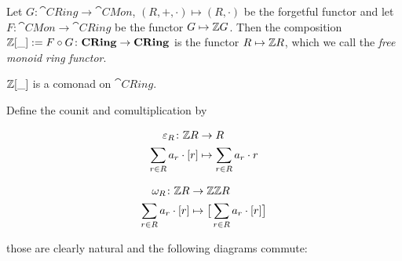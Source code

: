 Let $G \colon \cat{CRing} \to \cat{CMon}$, $(R,+,\cdot) \mapsto (R,\cdot)$
be the forgetful functor and
let $F \colon \cat{CMon} \to \cat{CRing}$ be the functor
$G \mapsto \mathbb{Z} G$. Then the composition $\mathbb{Z}[\_] := F \circ G \colon \mathbf{CRing} \to \mathbf{CRing}$
is the functor $R \mapsto \mathbb{Z} R$, which we call the \textit{free monoid ring functor}.
\begin{claim*}
    $\mathbb{Z}[\_]$ is a comonad on $\cat{CRing}$.
\end{claim*}
\begin{beweis}
    Define the counit and comultiplication by
    \begin{figure}[H]
    \centering
    \begin{subfigure}{0.4\textwidth}
    \centering
    \begin{align*}
    \varepsilon_R \colon \mathbb{Z} R &\to R \\
    \sum_{r \in R} a_r \cdot [r] &\mapsto  \sum_{r \in R} a_r \cdot r
    \end{align*}
    \end{subfigure}
    \hspace{2em}
    \begin{subfigure}{0.4\textwidth}
    \centering
    \begin{align*}
    \omega_R \colon \mathbb{Z} R &\to \mathbb{Z} \mathbb{Z} R \\
    \sum_{r \in R} a_r \cdot [r] &\mapsto \big[\sum_{r \in R} a_r \cdot [r]\big]
    \end{align*}
    \end{subfigure}
    \end{figure}
    those are clearly natural and the following diagrams commute:
    \begin{figure}[H]
        \centering
        \begin{subfigure}{0.4\textwidth}
        \centering
        \end{subfigure}
        \hspace{2em}
        \begin{subfigure}{0.4\textwidth}
        \centering
        \end{subfigure}
        \end{figure}
\end{beweis}
